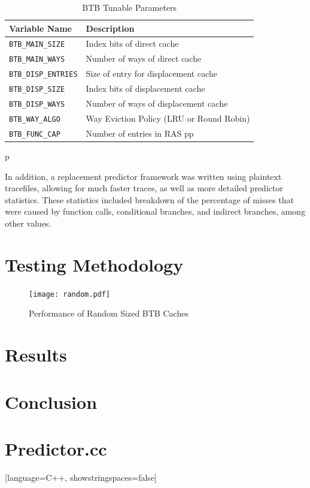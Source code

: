 \documentclass[twocolumn]{article}
\newcommand{\centerimage}[3]{
\begin{figure}[ht!]  
\begin{center}
#1
\caption{#2}
\label{#3}
\end{center}
\end{figure}}
\begin{document}
\begin{table}
\begin{center}\begin{tabular}{p{}p{}}
Variable Name & Description \\
\hline
\texttt{BTB\_MAIN\_SIZE} & Index bits of direct cache \\
\texttt{BTB\_MAIN\_WAYS} & Number of ways of direct cache \\
\texttt{BTB\_DISP\_ENTRIES} & Size of entry for displacement cache \\
\texttt{BTB\_DISP\_SIZE} & Index bits of displacement cache \\
\texttt{BTB\_DISP\_WAYS} & Number of ways of displacement cache \\
\texttt{BTB\_WAY\_ALGO} & Way Eviction Policy (LRU or Round Robin) \\
\texttt{BTB\_FUNC\_CAP} & Number of entries in RAS pp
\end{tabular}\end{center}
\caption{BTB Tunable Parameters}
p\label{envars}
\end{table}

In addition, a replacement predictor framework was written using
plaintext tracefiles, allowing for much faster traces, as well as more
detailed predictor statistics. These statistics included breakdown of
the percentage of misses that were caused by function calls,
conditional branches, and indirect branches, among other values. 

\section{Testing Methodology}
\centerimage{\texttt{[image: random.pdf]}}{Performance
  of Random Sized BTB Caches}{bgraph}
\section{Results}
\section{Conclusion}
\newpage
\onecolumn
\section{Predictor.cc}
[language=C++, showstringspaces=false]
\end{document}
